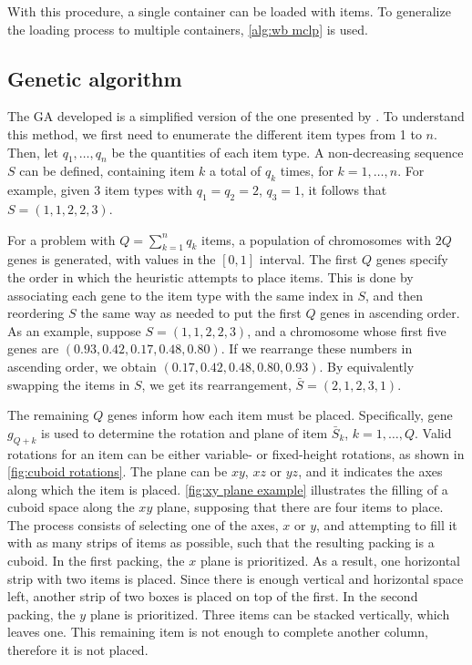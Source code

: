 With this procedure, a single container can be loaded with items. To generalize the loading process to multiple containers, \cref{alg:wb mclp} is used.



\subsection{Genetic algorithm}

The GA developed is a simplified version of the one presented by \textcite{GONÇALVES2011}. To understand this method, we first need to enumerate the different item types from 1 to $n$. Then, let $q_1, \dots, q_n$ be the quantities of each item type. A non-decreasing sequence $S$ can be defined, containing item $k$ a total of $q_k$ times, for $k = 1,\dots,n$. For example, given 3 item types with $q_1 = q_2 = 2$, $q_3 = 1$, it follows that $S = (1, 1, 2, 2, 3)$.

For a problem with $Q = \sum_{k=1}^{n}q_k$ items, a population of chromosomes with $2Q$ genes is generated, with values in the $[0, 1]$ interval. The first $Q$ genes specify the order in which the heuristic attempts to place items. This is done by associating each gene to the item type with the same index in $S$, and then reordering $S$ the same way as needed to put the first $Q$ genes in ascending order. As an example, suppose $S = (1, 1, 2, 2, 3)$, and a chromosome whose first five genes are $(0.93, 0.42, 0.17, 0.48, 0.80)$. If we rearrange these numbers in ascending order, we obtain $(0.17, 0.42, 0.48, 0.80, 0.93)$. By equivalently swapping the items in $S$, we get its rearrangement, $\bar{S} = (2, 1, 2, 3, 1)$.

The remaining $Q$ genes inform how each item must be placed. Specifically, gene $g_{Q+k}$ is used to determine the rotation and plane of item $\bar{S}_k$, $k = 1, \dots, Q$. Valid rotations for an item can be either variable- or fixed-height rotations, as shown in \cref{fig:cuboid rotations}. The plane can be $xy$, $xz$ or $yz$, and it indicates the axes along which the item is placed. \cref{fig:xy plane example} illustrates the filling of a cuboid space along the $xy$ plane, supposing that there are four items to place. The process consists of selecting one of the axes, $x$ or $y$, and attempting to fill it with as many strips of items as possible, such that the resulting packing is a cuboid. In the first packing, the $x$ plane is prioritized. As a result, one horizontal strip with two items is placed. Since there is enough vertical and horizontal space left, another strip of two boxes is placed on top of the first. In the second packing, the $y$ plane is prioritized. Three items can be stacked vertically, which leaves one. This remaining item is not enough to complete another column, therefore it is not placed.


